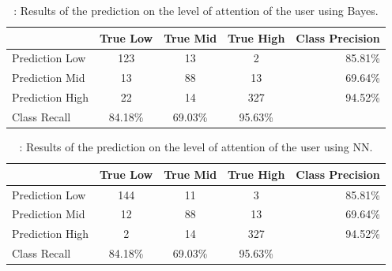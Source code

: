 \documentclass[journal]{IEEEtran}
\begin{document}

\begin{table}[H]
\caption{: Results of the prediction on the level of attention of the user using Bayes. }
\begin{tabular}{l*{3}{c}r}
									& True Low & True Mid & True High & Class Precision \\
\hline
Prediction Low  & 123 & 13 & 2 & 85.81\% \\
Prediction Mid  & 13 & 88 & 13 & 69.64\%  \\
Prediction High & 22 & 14 & 327 & 94.52\%  \\
\hline
Class Recall    & 84.18\% & 69.03\% & 95.63\% &  \\
\end{tabular}	
\end{table}



\begin{table}[H]
\caption{: Results of the prediction on the level of attention of the user using NN. }
\begin{tabular}{l*{3}{c}r}
									& True Low & True Mid & True High & Class Precision \\
\hline
Prediction Low  & 144 & 11 & 3 & 85.81\% \\
Prediction Mid  & 12 & 88 & 13 & 69.64\%  \\
Prediction High & 2 & 14 & 327 & 94.52\%  \\
\hline
Class Recall    & 84.18\% & 69.03\% & 95.63\% &  \\
\end{tabular}	
\end{table}


%
%
\end{document}

